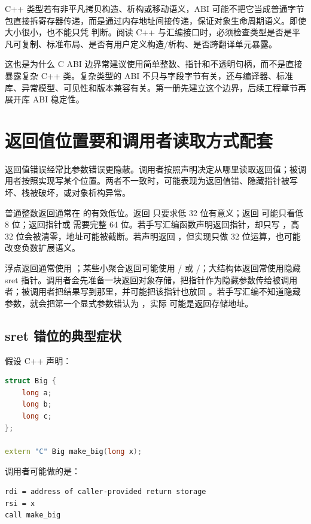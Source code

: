 C++ 类型若有非平凡拷贝构造、析构或移动语义，ABI 可能不把它当成普通字节包直接拆寄存器传递，而是通过内存地址间接传递，保证对象生命周期语义。即使大小很小，也不能只凭  判断。阅读 C++ 与汇编接口时，必须检查类型是否是平凡可复制、标准布局、是否有用户定义构造/析构、是否跨翻译单元暴露。

这也是为什么 C ABI 边界常建议使用简单整数、指针和不透明句柄，而不是直接暴露复杂 C++ 类。复杂类型的 ABI 不只与字段字节有关，还与编译器、标准库、异常模型、可见性和版本兼容有关。第一册先建立这个边界，后续工程章节再展开库 ABI 稳定性。

\section{返回值位置要和调用者读取方式配套}

返回值错误经常比参数错误更隐蔽。调用者按照声明决定从哪里读取返回值；被调用者按照实现写某个位置。两者不一致时，可能表现为返回值错、隐藏指针被写坏、栈被破坏，或对象析构异常。

普通整数返回通常在  的有效低位。返回  只要求低 32 位有意义；返回  可能只看低 8 位；返回指针或  需要完整 64 位。若手写汇编函数声明返回指针，却只写 ，高 32 位会被清零，地址可能被截断。若声明返回 ，但实现只做 32 位运算，也可能改变负数扩展语义。

浮点返回通常使用 ；某些小聚合返回可能使用 / 或 /；大结构体返回常使用隐藏 sret 指针。调用者会先准备一块返回对象存储，把指针作为隐藏参数传给被调用者；被调用者把结果写到那里，并可能把该指针也放回 。若手写汇编不知道隐藏参数，就会把第一个显式参数错认为 ，实际  可能是返回存储地址。

\subsection{sret 错位的典型症状}

假设 C++ 声明：

\begin{lstlisting}[language=C++]
struct Big {
    long a;
    long b;
    long c;
};

extern "C" Big make_big(long x);
\end{lstlisting}

调用者可能做的是：

\begin{lstlisting}
rdi = address of caller-provided return storage
rsi = x
call make_big
\end{lstlisting}

